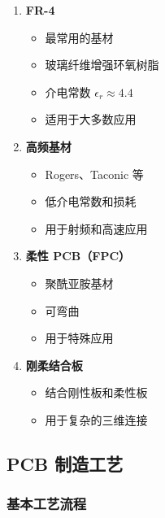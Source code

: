 \begin{enumerate}
  \item \textbf{FR-4}
    \begin{itemize}
      \item 最常用的基材
      \item 玻璃纤维增强环氧树脂
      \item 介电常数 $\epsilon_r \approx 4.4$
      \item 适用于大多数应用
    \end{itemize}

  \item \textbf{高频基材}
    \begin{itemize}
      \item Rogers、Taconic 等
      \item 低介电常数和损耗
      \item 用于射频和高速应用
    \end{itemize}

  \item \textbf{柔性 PCB（FPC）}
    \begin{itemize}
      \item 聚酰亚胺基材
      \item 可弯曲
      \item 用于特殊应用
    \end{itemize}

  \item \textbf{刚柔结合板}
    \begin{itemize}
      \item 结合刚性板和柔性板
      \item 用于复杂的三维连接
    \end{itemize}
\end{enumerate}

\subsection{PCB 制造工艺}

\subsubsection{基本工艺流程}

